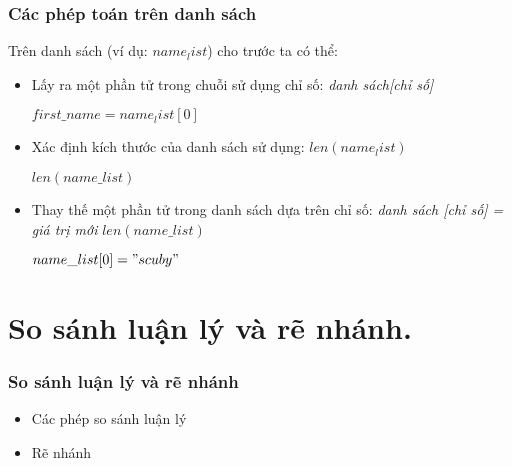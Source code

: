 \documentclass{beamer}
\begin{document}
\begin{frame}[label=listoper]
\frametitle{Các phép toán trên danh sách }


Trên danh sách (ví dụ: $name_list$) cho trước ta có thể:    
\begin{itemize}
\item Lấy ra một phần tử trong chuỗi sử dụng chỉ số: \textit{danh sách[chỉ số]}
\begin{example}
$first\_name = name_list[0]$ 
\end{example} 
\item Xác định kích thước của danh sách sử dụng: $len(name_list)$
\begin{example}
$len(name\_list) $
\end{example} 

\item Thay thế một phần tử trong danh sách dựa trên chỉ số: \textit{danh sách [chỉ số] = giá trị mới} $len(name\_list)$
\begin{example}
$name\_list[0] = "scuby" $
\end{example}


\end{itemize}
\hyperlink{cautrucdulieu}{}
\end{frame}

\section{So sánh luận lý và rẽ nhánh.}
\begin{frame}[label=luanly]
\frametitle{So sánh luận lý và rẽ nhánh}

\begin{itemize}
\item Các phép so sánh luận lý \hyperlink{sosanh}{\beamerbutton{$\unrhd$}}
\item Rẽ nhánh  \hyperlink{renhanh}{\beamerbutton{$\unrhd$}}

\end{itemize}
\hyperlink{intro}{}
\hyperlink{vonglap}{}
\end{frame}
\end{document}
